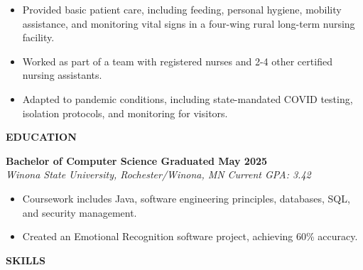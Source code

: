 \begin{itemize}
\item
  Provided basic patient care, including feeding, personal hygiene,
  mobility assistance, and monitoring vital signs in a four-wing rural
  long-term nursing facility.
\item
  Worked as part of a team with registered nurses and 2-4 other
  certified nursing assistants.
\item
  Adapted to pandemic conditions, including state-mandated COVID
  testing, isolation protocols, and monitoring for visitors.
\end{itemize}

\textbf{EDUCATION}

\textbf{Bachelor of Computer Science Graduated May 2025}\\
\emph{Winona State University, Rochester/Winona, MN} \emph{Current GPA:
3.42}

\begin{itemize}
\item
  Coursework includes Java, software engineering principles, databases,
  SQL, and security management.
\item
  Created an Emotional Recognition software project, achieving 60\%
  accuracy.
\end{itemize}

\textbf{SKILLS}

